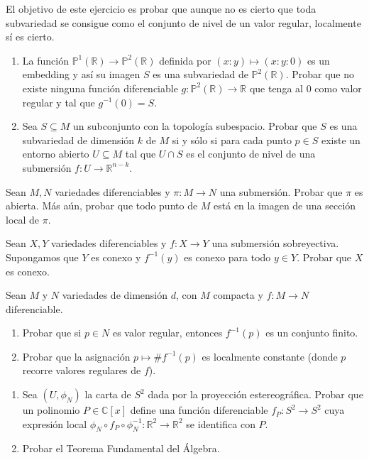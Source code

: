 \documentclass[12pt, a4paper]{amsart}
\theoremstyle{definition}
\newcommand{\CC}{\mathbb{C}}
\newcommand{\RR}{\mathbb{R}}      %
\begin{document}
\begin{question}El objetivo de este ejercicio es probar que aunque no es cierto que toda subvariedad se consigue como el conjunto de nivel de un valor regular, localmente sí es cierto.
\begin{enumerate}[label=\textbf{\alph*.}]
\item La función $\mathbb{P}^1(\RR) \to \mathbb{P}^2(\RR)$ definida por $(x:y)\mapsto(x:y:0)$ es un embedding y así su imagen $S$ es una subvariedad de $\mathbb{P}^2(\RR)$. Probar que no existe ninguna función diferenciable $g:\mathbb{P}^2(\RR)\to \RR$ que tenga al $0$ como valor regular y tal que $g^{-1}(0)=S$.
\item Sea $S\subseteq M$ un subconjunto con la topología subespacio. Probar que $S$ es una subvariedad de dimensión $k$ de $M$ si y sólo si para cada punto $p\in S$ existe un entorno abierto $U\subseteq M$ tal que $U\cap S$ es el conjunto de nivel de una submersión $f:U\to\RR^{n-k}$.
\end{enumerate}
\end{question}

\begin{question}
Sean $M,N$ variedades diferenciables y $\pi:M\to N$ una submersión. Probar que $\pi$ es abierta. Más aún, probar que todo punto de $M$ está en la imagen de una sección local de $\pi$.
\end{question}

\begin{question}
Sean $X,Y$ variedades diferenciables y $f:X\to Y$ una submersión sobreyectiva. Supongamos que $Y$ es conexo y $f^{-1}(y)$ es conexo para todo $y\in Y$. Probar que $X$ es conexo.
\end{question}

\begin{question}
Sean $M$ y $N$ variedades de dimensión $d$, con $M$ compacta y $f:M\to N$ diferenciable.
\begin{enumerate}[label=\textbf{\alph*.}]
\item Probar que si $p\in N$ es valor regular, entonces $f^{-1}(p)$ es un conjunto finito.
\item Probar que la asignación $p\mapsto \#f^{-1}(p)$ es localmente constante (donde $p$ recorre valores regulares de $f$).
\end{enumerate}
\end{question}

\begin{question}
\vspace{-1.5em}
\begin{enumerate}[label=\textbf{\alph*.}]
\item Sea $(U, \phi_N)$ la carta de $S^2$ dada por la proyección estereográfica. Probar que un polinomio $P\in\CC[x]$ define una función diferenciable $f_P:S^2\to S^2$ cuya expresión local
$\phi_N\circ f_P \circ \phi_N^{-1}\colon \RR^2 \to \RR^2 $ se identifica con $P$.
\item Probar el Teorema Fundamental del Álgebra.
\end{enumerate}
\end{question}
\end{document}
